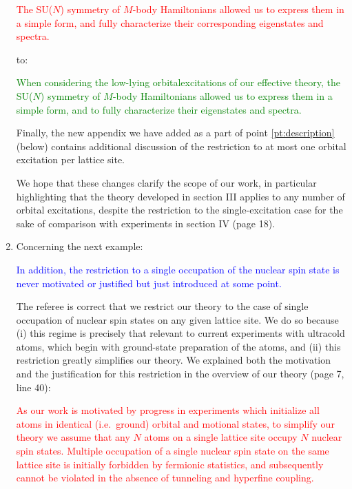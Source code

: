 \documentclass[preprint]{revtex4-1}
\newcommand{\1}{\mathds{1}}
\newcommand{\blue}[1]{\textcolor{blue}{#1}}
\newcommand{\red}[1]{\textcolor{red}{#1}}
\newcommand{\green}[1]{\textcolor{green}{#1}}
\begin{document}
\begin{enumerate}
  \red{The SU($N$) symmetry of $M$-body Hamiltonians allowed us to
    express them in a simple form, and fully characterize their
    corresponding eigenstates and spectra.}

  to:

  \green{When considering the low-lying orbitalexcitations of our
    effective theory, the SU($N$) symmetry of $M$-body Hamiltonians
    allowed us to express them in a simple form, and to fully
    characterize their eigenstates and spectra.}

  Finally, the new appendix we have added as a part of point
  \ref{pt:description} (below) contains additional discussion of the
  restriction to at most one orbital excitation per lattice site.

  We hope that these changes clarify the scope of our work, in
  particular highlighting that the theory developed in section III
  applies to any number of orbital excitations, despite the
  restriction to the single-excitation case for the sake of comparison
  with experiments in section IV (page 18).


\item Concerning the next example:

  \blue{In addition, the restriction to a single occupation of the
    nuclear spin state is never motivated or justified but just
    introduced at some point.}

  \label{pt:single_nuclear}

  The referee is correct that we restrict our theory to the case of
  single occupation of nuclear spin states on any given lattice site.
  We do so because (i) this regime is precisely that relevant to
  current experiments with ultracold atoms, which begin with
  ground-state preparation of the atoms, and (ii) this restriction
  greatly simplifies our theory.  We explained both the motivation and
  the justification for this restriction in the overview of our theory
  (page 7, line 40):

  \red{As our work is motivated by progress in experiments which
    initialize all atoms in identical (i.e.~ground) orbital and
    motional states, to simplify our theory we assume that any $N$
    atoms on a single lattice site occupy $N$ nuclear spin states.
    Multiple occupation of a single nuclear spin state on the same
    lattice site is initially forbidden by fermionic statistics, and
    subsequently cannot be violated in the absence of tunneling and
    hyperfine coupling.}


\end{enumerate}
\end{document}

